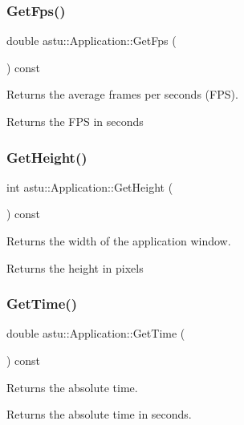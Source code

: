\subsubsection{\texorpdfstring{Get\+Fps()}{GetFps()}}
{\footnotesize\ttfamily double astu\+::\+Application\+::\+Get\+Fps (\begin{DoxyParamCaption}{ }\end{DoxyParamCaption}) const}

Returns the average frames per seconds (F\+PS).

\begin{DoxyReturn}{Returns}
the F\+PS in seconds 
\end{DoxyReturn}
\mbox{\label{classastu_1_1Application_aacee0ec39dbde4c506987abe4be99099}} 
\subsubsection{\texorpdfstring{Get\+Height()}{GetHeight()}}
{\footnotesize\ttfamily int astu\+::\+Application\+::\+Get\+Height (\begin{DoxyParamCaption}{ }\end{DoxyParamCaption}) const}

Returns the width of the application window.

\begin{DoxyReturn}{Returns}
the height in pixels 
\end{DoxyReturn}
\mbox{\label{classastu_1_1Application_afd91358b09a41d418bc1776befdb0fd7}} 
\subsubsection{\texorpdfstring{Get\+Time()}{GetTime()}}
{\footnotesize\ttfamily double astu\+::\+Application\+::\+Get\+Time (\begin{DoxyParamCaption}{ }\end{DoxyParamCaption}) const}

Returns the absolute time.

\begin{DoxyReturn}{Returns}
the absolute time in seconds. 
\end{DoxyReturn}
\mbox{\label{classastu_1_1Application_a7456b7ba3af6c3d984d6f4e40b268426}} 
